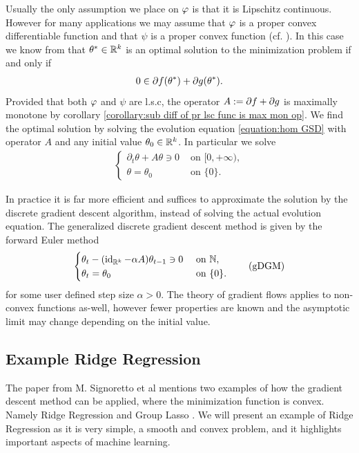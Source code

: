 Usually the only assumption we place on $ \varphi $ is that
it is Lipschitz continuous. However for many applications 
we may assume that $ \varphi $ is a proper convex
differentiable function and that $ \psi $ is a proper convex function
(cf. \cite[Section 3.1]{signoretto2014learning}).
In this case we know from 
\cite{rockafellar2015convex} 
that $ \theta^{\ast}\in\mathbb{R}^k $
is an optimal solution to the minimization problem
if and only if
\begin{align*}
	0\in \partial f(\theta^{\ast})+\partial g(\theta^{\ast}).
\end{align*} 
Provided that both $ \varphi $ and $ \psi $ are l.s.c,
the operator $ A:=\partial f+\partial g $
is maximally monotone by 
corollary \ref{corollary:sub diff of pr lsc func is max mon op}.
We find the optimal solution by solving the evolution
equation \ref{equation:hom GSD}
with operator $ A $ and any
initial value $ \theta_0\in \mathbb{R}^k $. In particular
we solve
\begin{align*}
	\begin{cases}
		\partial_t \theta+A\theta \ni 0 & \text{ on }[0,\plus\infty),\\
		\theta=\theta_0 & \text{ on }\{0\}.
	\end{cases}
\end{align*}

In practice it is far more efficient and suffices to approximate the solution
by the discrete gradient descent algorithm,
instead of solving the actual evolution
equation. The generalized discrete gradient
descent method is given by the forward Euler method  
\begin{align}\label{equation:disc grad desc meth}
	\begin{cases}
		\theta_t-(\operatorname{\mathrm{id}}_{\mathbb{R}^k}-\alpha A)\theta_{t-1} \ni 0 & \text{ on }\mathbb{N},\\
		\theta_t=\theta_0 & \text{ on }\{0\}.
	\end{cases}
	\tag{gDGM}
\end{align}
for some user defined step size $ \alpha>0 $.
The theory of gradient flows applies
to non-convex functions as-well, however
fewer properties are known and the
asymptotic limit may change depending
on the initial value.

\subsection{Example Ridge Regression}
The paper \cite[Section 3.2]{signoretto2014learning} from M. Signoretto et al
mentions two examples of how the gradient descent method
can be applied, where the minimization function
is convex. Namely Ridge Regression \cite{hoerl1970ridge}
and Group Lasso \cite{jacob2009group}. We will present
an example of Ridge Regression as it is very simple,
a smooth and convex problem,
and it highlights important aspects of machine learning.
\smallskip

